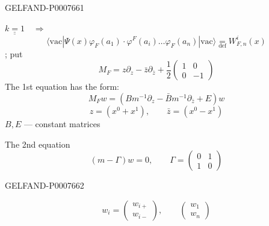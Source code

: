 \begin{GelfandAdjacentEvidence}{GELFAND-P000766}{1}

\(\underline{\underline{k=1}}\quad\Rightarrow\)
\begin{equation*}
\tag{20}
\langle\mathrm{vac}|\Psi(x)\varphi_F(a_1)\cdot\varphi^F(a_i)
\ldots\varphi_F(a_n)|\mathrm{vac}\rangle
\underset{\mathrm{def}}{=}W^i_{F,n}(x)
\end{equation*}
; put
\begin{equation*}
\tag{21}
M_F=z\partial_z-\bar z\partial_{\bar z}+\frac12
\begin{pmatrix}1&0\\0&-1\end{pmatrix}
\end{equation*}
The 1st equation has the form:
\begin{equation*}
\tag{22}
M_Fw=(Bm^{-1}\partial_z-\bar Bm^{-1}\partial_{\bar z}+E)w
\end{equation*}
\[
z=(x^0+x^1),\qquad\bar z=(x^0-x^1)
\]
\(B,E\) --- constant matrices

The 2nd equation
\begin{equation*}
\tag{23}
(m-\Gamma)w=0,\qquad\Gamma=\begin{pmatrix}0&1\\1&0\end{pmatrix}
\end{equation*}
\end{GelfandAdjacentEvidence}
\begin{GelfandAdjacentEvidence}{GELFAND-P000766}{2}

\[
w_i=\begin{pmatrix}w_{i+}\\w_{i-}\end{pmatrix},\qquad
\begin{pmatrix}w_1\\w_n\end{pmatrix}
\]
\end{GelfandAdjacentEvidence}
